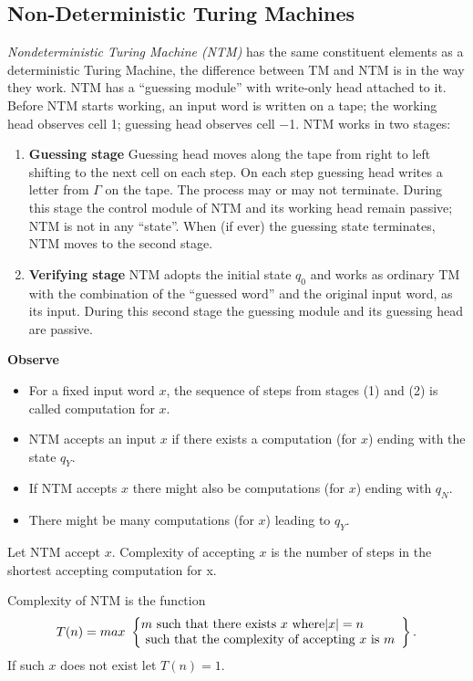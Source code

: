 \subsection{Non-Deterministic Turing Machines}
\begin{definition}
    \textit{Nondeterministic Turing Machine (NTM)} has
    the same constituent elements as a deterministic Turing Machine,
    the difference between TM and NTM is in the way they work.
    NTM has a “guessing module” with write-only head attached to it.
    Before NTM starts working, an input word is written on a tape;
    the working head observes cell 1; guessing head observes cell −1.
    NTM works in two stages:
    \begin{enumerate}
        \item \textbf{Guessing stage}
            Guessing head moves along the tape from right to left
            shifting to the next cell on each step.
            On each step guessing head writes a letter from $\Gamma$ on the tape.
            The process may or may not terminate.
            During this stage the control module of NTM and its working head remain passive;
            NTM is not in any “state”. When (if ever) the guessing state terminates, NTM moves to the second stage.
        \item \textbf{Verifying stage}
            NTM adopts the initial state $q_0$ and works as ordinary TM
            with the combination of the “guessed word” and the original input word, as its input.
            During this second stage the guessing module and its guessing head are passive.
    \end{enumerate}
    \textbf{Observe}
    \begin{itemize}
        \item For a fixed input word $x$, the sequence of steps from stages (1) and (2) is called computation for $x$.
        \item NTM accepts an input $x$ if there exists a computation (for $x$) ending with the state $q_Y$.
        \item If NTM accepts $x$ there might also be computations (for $x$) ending with $q_N$.
        \item There might be many computations (for $x$) leading to $q_Y$.
    \end{itemize}
\end{definition}
\begin{definition}
    Let NTM accept $x$.
    Complexity of accepting $x$ is the number of steps in the shortest accepting computation for x.
\end{definition}
\begin{definition}
    Complexity of NTM is the function
    \begin{equation}
        T(n) = max\ \left\{
            \begin{array}{@{}ll@{}}
                m \textrm{ such that there exists }x\textrm{ where} |x| = n\\
                \textrm{ such that the complexity of accepting }x\textrm{ is }m
            \end{array}\right\}.
    \end{equation}
    If such $x$ does not exist let $T(n) = 1$.
\end{definition}
